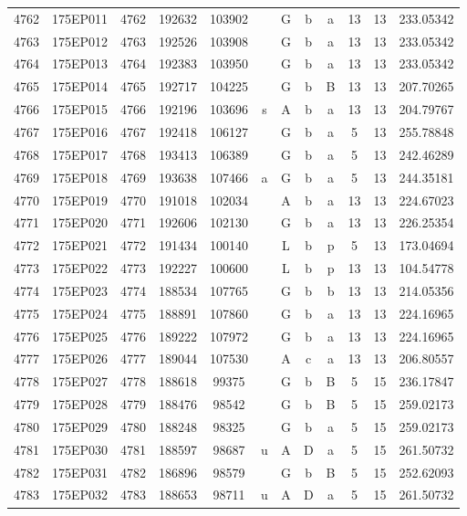 \begin{tabular}{|*{12}{c|}}
4762 & 175EP011 & 4762 & 192632 & 103902 &  & G & b & a & 13 & 13 & 233.05342 \\ 
4763 & 175EP012 & 4763 & 192526 & 103908 &  & G & b & a & 13 & 13 & 233.05342 \\ 
4764 & 175EP013 & 4764 & 192383 & 103950 &  & G & b & a & 13 & 13 & 233.05342 \\ 
4765 & 175EP014 & 4765 & 192717 & 104225 &  & G & b & B & 13 & 13 & 207.70265 \\ 
4766 & 175EP015 & 4766 & 192196 & 103696 & s & A & b & a & 13 & 13 & 204.79767 \\ 
4767 & 175EP016 & 4767 & 192418 & 106127 &  & G & b & a & 5 & 13 & 255.78848 \\ 
4768 & 175EP017 & 4768 & 193413 & 106389 &  & G & b & a & 5 & 13 & 242.46289 \\ 
4769 & 175EP018 & 4769 & 193638 & 107466 & a & G & b & a & 5 & 13 & 244.35181 \\ 
4770 & 175EP019 & 4770 & 191018 & 102034 &  & A & b & a & 13 & 13 & 224.67023 \\ 
4771 & 175EP020 & 4771 & 192606 & 102130 &  & G & b & a & 13 & 13 & 226.25354 \\ 
4772 & 175EP021 & 4772 & 191434 & 100140 &  & L & b & p & 5 & 13 & 173.04694 \\ 
4773 & 175EP022 & 4773 & 192227 & 100600 &  & L & b & p & 13 & 13 & 104.54778 \\ 
4774 & 175EP023 & 4774 & 188534 & 107765 &  & G & b & b & 13 & 13 & 214.05356 \\ 
4775 & 175EP024 & 4775 & 188891 & 107860 &  & G & b & a & 13 & 13 & 224.16965 \\ 
4776 & 175EP025 & 4776 & 189222 & 107972 &  & G & b & a & 13 & 13 & 224.16965 \\ 
4777 & 175EP026 & 4777 & 189044 & 107530 &  & A & c & a & 13 & 13 & 206.80557 \\ 
4778 & 175EP027 & 4778 & 188618 & 99375 &  & G & b & B & 5 & 15 & 236.17847 \\ 
4779 & 175EP028 & 4779 & 188476 & 98542 &  & G & b & B & 5 & 15 & 259.02173 \\ 
4780 & 175EP029 & 4780 & 188248 & 98325 &  & G & b & a & 5 & 15 & 259.02173 \\ 
4781 & 175EP030 & 4781 & 188597 & 98687 & u & A & D & a & 5 & 15 & 261.50732 \\ 
4782 & 175EP031 & 4782 & 186896 & 98579 &  & G & b & B & 5 & 15 & 252.62093 \\ 
4783 & 175EP032 & 4783 & 188653 & 98711 & u & A & D & a & 5 & 15 & 261.50732 \\ 

\end{tabular}
